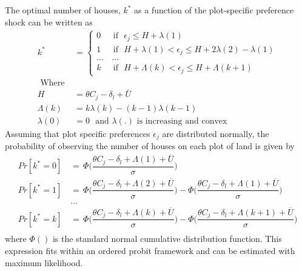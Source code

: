\documentclass[12pt]{article}
\begin{document}
The optimal number of houses, $k^{*}$ as a function of the plot-specific preference shock can be written as 
\begin{align*}
k^{*} &=
\begin{cases}
0 &\text{ if }\,\, \epsilon_j \leq H + \lambda(1)  \\
1 &\text{ if }\,\,  H + \lambda(1)  < \epsilon_j \leq H  + 2\lambda(2) - \lambda(1)  \\
... & \, ... \\
k &\text{ if }\,\,  H + \Lambda(k) < \epsilon_j \leq H + \Lambda(k+1)
\end{cases} \\
\text{ Where }& \\
H & = \theta C_{j} - \delta_{l}  + \bar{U} \\
\Lambda(k) & =  k\lambda(k) - (k-1)\lambda(k-1) \\
\lambda(0) & = 0 \,\, \text{ and } \lambda(.) \text{ is increasing and convex }
\end{align*}
Assuming that plot specific preferences $\epsilon_j$ are distributed normally, the probability of observing the number of houses on each plot of land is given by
\begin{align*}
Pr[ k^{*} =0 ] \, &= \, \Phi\Bigg(\dfrac{\theta C_{j} - \delta_{l} + \Lambda(1) + \overline{U}}{\sigma}\Bigg) \\
Pr[ k^{*} =1 ] \, &= \, \Phi\Bigg(\dfrac{\theta C_{j} - \delta_{l} + \Lambda(2) + \overline{U}}{\sigma}\Bigg) - \Phi\Bigg(\dfrac{\theta C_{j} - \delta_{l} +  \Lambda(1)  + \overline{U}}{\sigma}\Bigg) \\
&... \\
Pr[ k^{*} =k ] \, &= \, \Phi\Bigg(\dfrac{\theta C_{j} - \delta_{l} + \Lambda(k) + \overline{U}}{\sigma}\Bigg) - \Phi\Bigg(\dfrac{\theta C_{j} - \delta_{l} + \Lambda(k+1) + \overline{U}}{\sigma}\Bigg) \\
\end{align*}
where $\Phi()$ is the standard normal cumulative distribution function.  This expression fits within an ordered probit framework and can be estimated with maximum likelihood.
\end{document}
